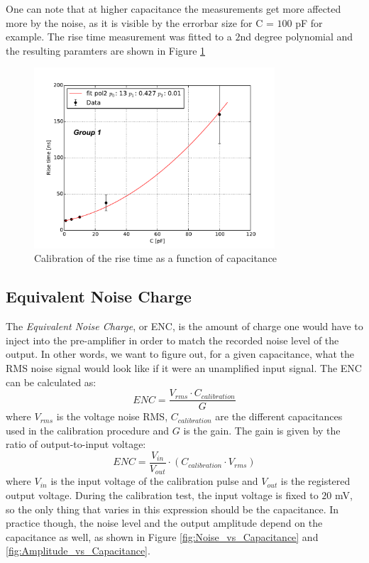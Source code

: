 \documentclass[12pt]{article}
\begin{document}
 One can note that at higher capacitance the measurements get more affected more by the noise, as it is visible by the errorbar size for C = $100$ pF for example. The rise time measurement was fitted to a $2$nd degree polynomial and the resulting paramters are shown in Figure \ref{fig:RiseTime_vs_Capacitance}

\begin{figure}[H]
  \centering
  \includegraphics[width=0.8\textwidth]{./graphics/calibration_diode}
  \caption{Calibration of the rise time as a function of capacitance} %
  \label{fig:RiseTime_vs_Capacitance}
\end{figure}



\subsection{Equivalent Noise Charge}

The \textit{Equivalent Noise Charge}, or ENC, is the amount of charge one would have to inject into the pre-amplifier in order to match the recorded noise level of the output. In other words, we want to figure out, for a given capacitance, what the RMS noise signal would look like if it were an unamplified input signal. The ENC can be calculated as:
\begin{equation}
ENC = \frac{V_{rms}\cdot C_{calibration}}{G}
\end{equation}
where $V_{rms}$ is the voltage noise RMS, $C_{calibration}$ are the different capacitances used in the calibration procedure and $G$ is the gain.
The gain is given by the ratio of output-to-input voltage:
\begin{equation}
ENC = \frac{V_{in}}{V_{out}}\cdot\left(C_{calibration}\cdot V_{rms}\right)
\end{equation}
where $V_{in}$ is the input voltage of the calibration pulse and $V_{out}$ is the registered output voltage.
During the calibration test, the input voltage is fixed to $20$ mV, so the only thing that varies in this expression should be the capacitance. In practice though, the noise level and the output amplitude depend on the capacitance as well, as shown in Figure \ref{fig:Noise_vs_Capacitance} and \ref{fig:Amplitude_vs_Capacitance}.
\end{document}
